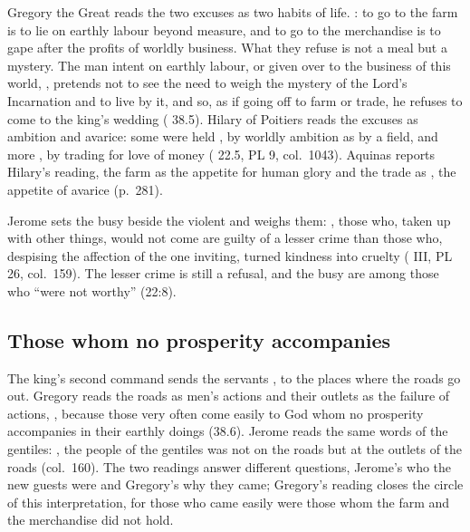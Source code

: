 Gregory the Great reads the two excuses as two habits of life. : to go to the farm is to lie
on earthly labour beyond measure, and to go to the merchandise is to gape
after the profits of worldly business. What they refuse is not a meal but a
mystery. The man intent on earthly labour, or given over to the business of
this world, , pretends not to see the need to weigh the mystery of the
Lord's Incarnation and to live by it, and so, as if going off to farm or trade,
he refuses to come to the king's wedding ( 38.5).
Hilary of Poitiers reads the excuses as ambition and avarice: some were held
, by worldly ambition as by a field, and
more , by trading for love of money
( 22.5, PL 9, col.~1043). Aquinas reports
Hilary's reading, the farm as the appetite for human glory and the trade as
, the appetite of avarice (p.~281).

Jerome sets the busy beside the violent and weighs them: , those who, taken up
with other things, would not come are guilty of a lesser crime than those who,
despising the affection of the one inviting, turned kindness into cruelty
( III, PL 26, col.~159). The lesser crime is
still a refusal, and the busy are among those who ``were not worthy'' (22:8).

\subsection{Those whom no prosperity accompanies}

The king's second command sends the servants , to the
places where the roads go out. Gregory reads the roads as men's actions and
their outlets as the failure of actions, , because
those very often come easily to God whom no prosperity accompanies in their
earthly doings (38.6). Jerome reads the same words of the gentiles:
, the people
of the gentiles was not on the roads but at the outlets of the roads
(col.~160). The two readings answer different questions, Jerome's who the new
guests were and Gregory's why they came; Gregory's reading closes the circle of
this interpretation, for those who came easily were those whom the farm and
the merchandise did not hold.

